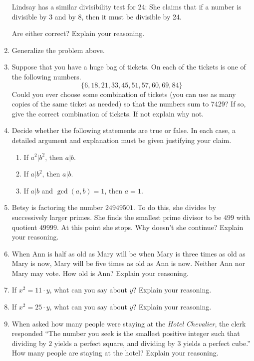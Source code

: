 \begin{problems}
\begin{enumerate}
Lindsay has a similar divisibility test for 24: She claims that if a
number is divisible by 3 and by 8, then it must be divisible by 24.

Are either correct?  Explain your reasoning.
\item Generalize the problem above.
\item Suppose that you have a huge bag of tickets. On each of the
  tickets is one of the following numbers. 
\[
\{6, 18, 21, 33, 45, 51, 57, 60, 69, 84\}
\]
Could you ever choose some combination of tickets (you can use as many
copies of the same ticket as needed) so that the numbers sum to 7429?
If so, give the correct combination of tickets. If not explain why
not.
\item\label{P:helper} Decide whether the following statements are true
  or false. In each case, a detailed argument and explanation must be
  given justifying your claim.
\begin{enumerate}
\item If $a^2|b^2$, then $a|b$.
\item If $a|b^2$, then $a|b$.
\item If $a|b$ and $\gcd(a,b) = 1$, then $a = 1$.
\end{enumerate}
\item Betsy is factoring the number $24949501$. To do this, she
  divides by successively larger primes. She finds the smallest prime
  divisor to be $499$ with quotient $49999$. At this point she
  stops. Why doesn't she continue? Explain your reasoning.
\item When Ann is half as old as Mary will be when Mary is three times
  as old as Mary is now, Mary will be five times as old as Ann is
  now. Neither Ann nor Mary may vote. How old is Ann? Explain your
  reasoning.
\item If $x^2 = 11\cdot y$, what can you say about $y$? Explain your
  reasoning.
\item If $x^2 = 25\cdot y$, what can you say about $y$? Explain your
  reasoning.
\item When asked how many people were staying at the \textit{Hotel
  Chevalier}, the clerk responded ``The number you seek is the
  smallest positive integer such that dividing by $2$ yields a perfect
  square, and dividing by $3$ yields a perfect cube.'' How many people
  are staying at the hotel? Explain your reasoning.
\end{enumerate}
\end{problems}

\newpage 


